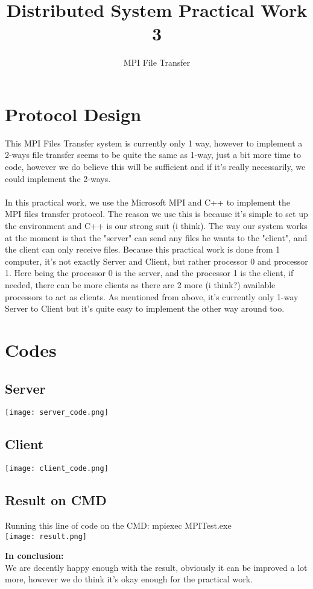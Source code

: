 \documentclass[12pt]{article}
\title{Distributed System Practical Work 3}
\author{MPI File Transfer}
\begin{document}
\maketitle

\tableofcontents
\pagebreak

\section{Protocol Design}
This MPI Files Transfer system is currently only 1 way, however to implement a 2-ways file transfer seems to be quite the same as 1-way, just a bit more time to code, however we do believe this will be sufficient and if it's really necessarily, we could implement the 2-ways.\\ \\
In this practical work, we use the Microsoft MPI and C++ to implement the MPI files transfer protocol. The reason we use this is because it's simple to set up the environment and C++ is our strong suit (i think). The way our system works at the moment is that the "server" can send any files he wants to the "client", and the client can only receive files. Because this practical work is done from 1 computer, it's not exactly Server and Client, but rather processor 0 and processor 1. Here being the processor 0 is the server, and the processor 1 is the client, if needed, there can be more clients as there are 2 more (i think?) available processors to act as clients. As mentioned from above, it's currently only 1-way Server to Client but it's quite easy to implement the other way around too.\\

\section{Codes}
\subsection{Server}
\texttt{[image: server\_code.png]}

\subsection{Client}
\texttt{[image: client\_code.png]}

\subsection{Result on CMD}
Running this line of code on the CMD: mpiexec MPITest.exe \\
\texttt{[image: result.png]}

\textbf{In conclusion:}\\
We are decently happy enough with the result, obviously it can be improved a lot more, however we do think it's okay enough for the practical work.
\end{document}
